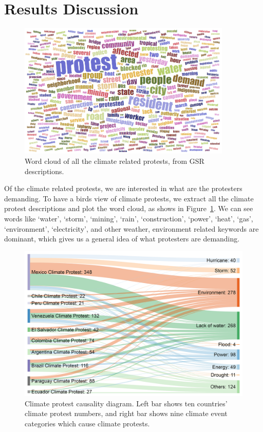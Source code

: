 \section{Results Discussion}

\begin{figure}[ht]
\centerline
{\includegraphics[width=4in]{figures/Climate_word_cloud.png}}
\caption{Word cloud of all the climate related protests, from GSR descriptions.}
\label{wordcloud}
\end{figure}

Of the climate related protests, we are interested in what are the protesters demanding. To have a birds view of climate protests, we extract all the climate protest descriptions and plot the word cloud, as shows in Figure~\ref{wordcloud}. We can see words like `water', `storm', `mining', `rain', `construction', `power', `heat', `gas', `environment', `electricity', and other weather, environment related keywords are dominant, which gives us a general idea of what protesters are demanding.

\begin{figure}[t]
\centerline
{\includegraphics[width=4.5in]{figures/causality1.png}}
\caption{Climate protest causality diagram. Left bar shows ten countries' climate protest numbers, and right bar shows nine climate event categories which cause climate protests.}
\label{causality}
\end{figure}

